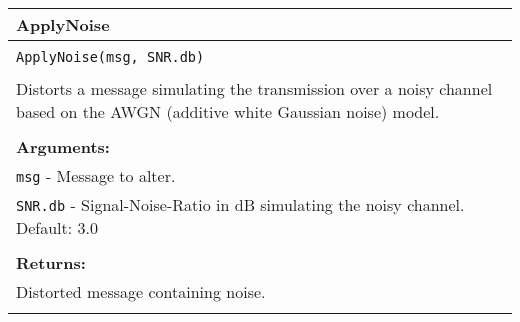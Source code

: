 \begin{longtable}{|p{\textwidth}|}
\hline
\rowcolor{lightblue}ApplyNoise\\
\hline
\\
\texttt{ApplyNoise(msg, SNR.db)}\\
\\
Distorts a message simulating the transmission over a noisy channel based on the AWGN (additive white Gaussian noise) model.\\
\\
\textbf{Arguments:}\\
\texttt{msg} - Message to alter.\\
\texttt{SNR.db} - Signal-Noise-Ratio in dB simulating the noisy channel. Default: 3.0\\
\\
\textbf{Returns:}\\
Distorted message containing noise.\\
\\
\hline
\end{longtable}